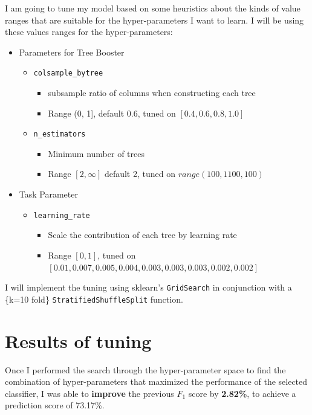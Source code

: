 I am going to tune my model based on some heuristics about the kinds of value ranges that are suitable for the hyper-parameters I want to learn. I will be using these values ranges for the hyper-parameters:

\begin{itemize}
\item Parameters for Tree Booster
    \begin{itemize}
        \item \texttt{colsample\_bytree}
        \begin{itemize}
            \item subsample ratio of columns when constructing each tree
            \item Range (0, 1], default 0.6, tuned on $[0.4, 0.6, 0.8, 1.0]$
        \end{itemize}
        \item \texttt{n\_estimators}
        \begin{itemize}
            \item Minimum number of trees
            \item Range $[2,\infty]$ default 2, tuned on $range(100, 1100, 100)$
        \end{itemize}

    \end{itemize}

\item Task Parameter
    \begin{itemize}
        \item \texttt{learning\_rate}
        \begin{itemize}
            \item Scale the contribution of each tree by learning rate
            \item Range $[0, 1]$, tuned on $[0.01, 0.007, 0.005, 0.004, 0.003, 0.003, 0.003, 0.002, 0.002]$
        \end{itemize}
    \end{itemize}
\end{itemize}
I will implement the tuning using sklearn's \texttt{GridSearch} in conjunction with a \{k=10 fold\} \texttt{StratifiedShuffleSplit} function. 

\section*{Results of tuning}
Once I performed the search through the hyper-parameter space to find the combination of hyper-parameters that maximized the performance of the selected classifier, I was able to \textbf{improve} the previous $F_1$ score by \textbf{2.82\%}, to achieve a prediction score of 73.17\%.


